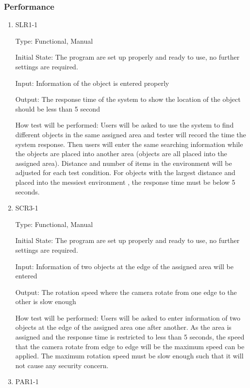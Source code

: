 \documentclass[12pt, titlepage]{article}
\begin{document}
\subsubsection{Performance}
\begin{enumerate}


\item{SLR1-1\\}

Type: Functional, Manual
					
Initial State: The program are set up properly and ready to use, no further settings are required.
					
Input: Information of the object is entered properly 
					
Output: The response time of the system to show the location of the object should be less than 5 second
					
How test will be performed: Users will be asked to use the system to find different objects in the same assigned area and tester will record the time the system response. Then users will enter the same searching information while the objects are placed into another area (objects are all placed into the assigned area). Distance and number of items in the environment will be adjusted for each test condition. For objects with the largest distance and placed into the messiest environment , the response time must be below 5 seconds.



\item{SCR3-1\\}

Type: Functional, Manual
					
Initial State: The program are set up properly and ready to use, no further settings are required.
					
Input: Information of two objects at the edge of the assigned area will be entered 
					
Output: The rotation speed where the camera rotate from one edge to the other is slow enough
					
How test will be performed: Users will be asked to enter information of two objects at the edge of the assigned area one after another. As the area is assigned and the response time is restricted to less than 5 seconds, the speed that the camera rotate from edge to edge will be the maximum speed can be applied. The maximum rotation speed must be slow enough such that it will not 
cause any security concern.

\item{PAR1-1\\}


\end{enumerate}
\end{document}
